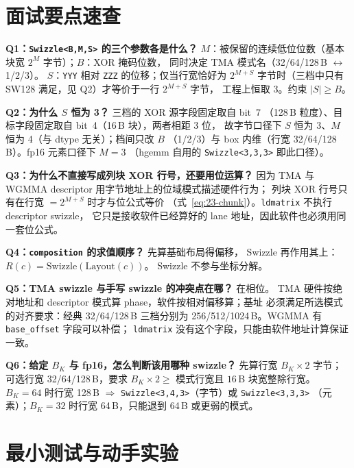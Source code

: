 \section{面试要点速查}

\textbf{Q1：\texttt{Swizzle\allowbreak{}<B,\allowbreak{}M,\allowbreak{}S>} 的三个参数各是什么？}
$M$：被保留的连续低位位数（基本块宽 $2^M$ 字节）；$B$：XOR 掩码位数，
同时决定 TMA 模式名（32/64/128\,B $\leftrightarrow$ 1/2/3）。
$S$：\texttt{YYY} 相对 \texttt{ZZZ} 的位移；仅当行宽恰好为 $2^{M+S}$
字节时（三档中只有 SW128 满足，见 Q2）才等价于一行 $2^{M+S}$ 字节，
工程上恒取 3。约束 $|S|\ge B$。

\textbf{Q2：为什么 $S$ 恒为 3？} 三档的 XOR 源字段固定取自 bit~7
（128\,B 粒度）、目标字段固定取自 bit~4（16\,B 块），两者相距 3 位，
故字节口径下 $S$ 恒为 3、$M$ 恒为 4（与 dtype 无关）；档间只改 $B$
（1/2/3）与 box 内维（行宽 32/64/128\,B）。fp16 元素口径下 $M=3$
（hgemm 自用的 \texttt{Swizzle\allowbreak{}<3,\allowbreak{}3,\allowbreak{}3>} 即此口径）。

\textbf{Q3：为什么不直接写成列块 XOR 行号，还要用位运算？}
因为 TMA 与 WGMMA descriptor 用字节地址上的位域模式描述硬件行为；
列块 XOR 行号只有在行宽 $=2^{M+S}$ 时才与位公式等价
（式~\eqref{eq:23-chunk}）。\texttt{ldmatrix} 不执行 descriptor swizzle，
它只是接收软件已经算好的 lane 地址，因此软件也必须用同一套位公式。

\textbf{Q4：\texttt{composition} 的求值顺序？} 先算基础布局得偏移，
Swizzle 再作用其上：$R(c)=\text{Swizzle}(\text{Layout}(c))$。
Swizzle 不参与坐标分解。

\textbf{Q5：TMA swizzle 与手写 swizzle 的冲突点在哪？} 在相位。
TMA 硬件按绝对地址和 descriptor 模式算 phase，软件按相对偏移算；基址
必须满足所选模式的对齐要求：经典 32/64/128\,B 三档分别为
256/512/1024\,B。WGMMA 有 \texttt{base\_offset} 字段可以补偿；
\texttt{ldmatrix} 没有这个字段，只能由软件地址计算保证一致。

\textbf{Q6：给定 $B_K$ 与 fp16，怎么判断该用哪种 swizzle？} 先算行宽
$B_K\times2$ 字节；可选行宽 32/64/128\,B，要求 $B_K\times2\ge$
模式行宽且 $16$\,B 块宽整除行宽。$B_K=64$ 时行宽 128\,B
$\Rightarrow$ \texttt{Swizzle\allowbreak{}<3,\allowbreak{}4,\allowbreak{}3>}（字节）或 \texttt{Swizzle\allowbreak{}<3,\allowbreak{}3,\allowbreak{}3>}
（元素）；$B_K=32$ 时行宽 64\,B，只能退到 64\,B 或更弱的模式。

\section{最小测试与动手实验}\label{sec:23-minitest}

